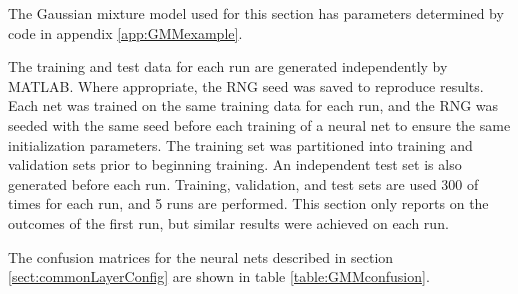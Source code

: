 \label{sect:GMMresults}
The Gaussian mixture model used for this section has parameters determined by code in appendix \ref{app:GMMexample}.


The training and test data for each run are generated independently by MATLAB. Where appropriate, the RNG seed was saved to reproduce results.  Each net was trained on the same training data for each run, and the RNG was seeded with the same seed before each training of a neural net to ensure the same initialization parameters. The training set was partitioned into training and validation sets prior to beginning training.  An independent test set is also generated before each run.  Training, validation, and test sets are used 300 of times for each run, and 5 runs are performed.  This section only reports on the outcomes of the first run, but similar results were achieved on each run.

The confusion matrices for the neural nets described in section \ref{sect:commonLayerConfig} are shown in table \ref{table:GMMconfusion}.

